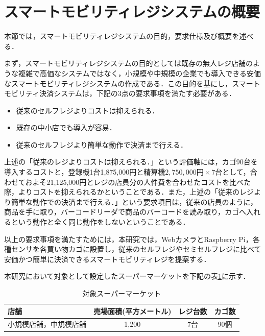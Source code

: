 

\section{スマートモビリティレジシステムの概要}

本節では，スマートモビリティレジシステムの目的，要求仕様及び概要を述べる．

まず，スマートモビリティレジシステムの目的としては既存の無人レジ店舗のような複雑で高価なシステムではなく，小規模や中規模の企業でも導入できる安価なスマートモビリティレジシステムの作成である．この目的を基にし，スマートモビリティ決済システムは，下記の3点の要求事項を満たす必要がある．

\begin{itemize}
\item 従来のセルフレジよりコストは抑えられる．
\item 既存の中小店でも導入が容易．
\item 従来のセルフレジより簡単な動作で決済まで行える．
\end{itemize}


上述の「従来のレジよりコストは抑えられる．」という評価軸には，カゴ90台を導入するコストと，登録機1台1,875,000円と精算機$2,750,000円\times7台$として，合わせておよそ21,125,000円\cite{super}とレジの店員分の人件費を合わせたコストを比べた際，よりコストを抑えられるかということである．また，上述の「従来のレジより簡単な動作での決済まで行える．」という要求項目は，従来の店員のように，商品を手に取り，バーコードリーダで商品のバーコードを読み取り，カゴへ入れるという動作と全く同じ動作をしないということである．

以上の要求事項を満たすためには，本研究では，WebカメラとRaspberry Pi，各種センサを各買い物カゴに設置し，従来のセルフレジやセミセルフレジに比べて安価かつ簡単に決済できるスマートモビリティレジを提案する．

本研究において対象として設定したスーパーマーケットを下記の表\ref{taisho}に示す．


\begin{table}[htb]
\begin{center}
\caption{対象スーパーマーケット}
\begin{tabular}{|l|c|c|c|} \hline
店舗 & 売場面積(平方メートル) & レジ台数 & カゴ数 \\ \hline
小規模店舗，中規模店舗 & 1,200 & 7台 & 90個 \\ \hline
\end{tabular}
\label{taisho}
\end{center}
\end{table}


